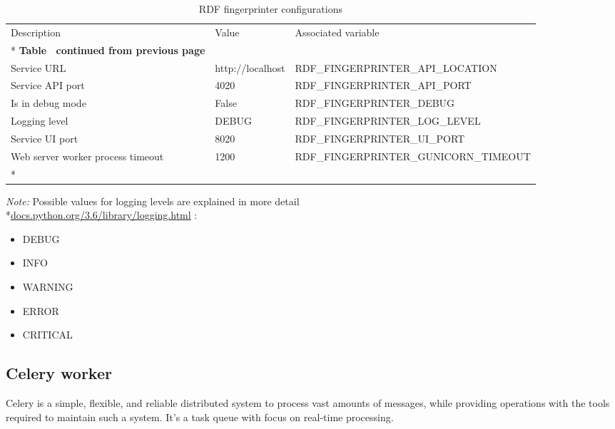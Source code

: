 \begin{longtable}[c]{@{}p{3.5cm}p{3.5cm}l@{}}
	\toprule
	Description                       & Value            & Associated variable               \\* \midrule
	\endfirsthead
	\multicolumn{3}{c}%
	{{\bfseries Table \thetable\ continued from previous page}}                              \\
	\endhead
	\bottomrule
	\endfoot
	\endlastfoot
	Service URL                       & http://localhost & RDF\_FINGERPRINTER\_API\_LOCATION     \\
	Service API port                  & 4020             & RDF\_FINGERPRINTER\_API\_PORT         \\
	Is in debug mode                  & False            & RDF\_FINGERPRINTER\_DEBUG             \\
	Logging level                     & DEBUG            & RDF\_FINGERPRINTER\_LOG\_LEVEL        \\
	Service UI port                   & 8020             & RDF\_FINGERPRINTER\_UI\_PORT          \\
	Web server worker process timeout & 1200             & RDF\_FINGERPRINTER\_GUNICORN\_TIMEOUT \\* \bottomrule
	\caption{RDF fingerprinter configurations}
	\label{tab:rdf-fingerprinter-configuration}                                                  \\
\end{longtable}

\textit{Note:} Possible values for logging levels are explained in more detail \\*\href{https://docs.python.org/3.6/library/logging.html#logging-levels}{docs.python.org/3.6/library/logging.html} :
\begin{itemize}
	\item DEBUG
	\item INFO
	\item WARNING
	\item ERROR
	\item CRITICAL
\end{itemize}

\subsection{Celery worker}
Celery is a simple, flexible, and reliable distributed system to process vast amounts of messages, while providing operations with the tools required to maintain such a system. It’s a task queue with focus on real-time processing.

